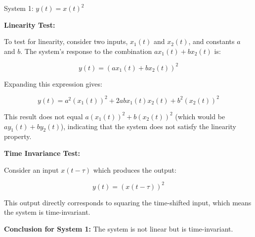 
\item[a)]
System 1: $y(t)=x(t)^{2}$

\textbf{Linearity Test:}

To test for linearity, consider two inputs, $x_1(t)$ and $x_2(t)$, and constants $a$ and $b$. The system's response to the combination $a x_1(t) + b x_2(t)$ is:

$$
y(t) = \left(a x_1(t) + b x_2(t)\right)^2
$$

Expanding this expression gives:

$$
y(t) = a^2 (x_1(t))^2 + 2ab x_1(t) x_2(t) + b^2 (x_2(t))^2
$$

This result does not equal $a (x_1(t))^2 + b (x_2(t))^2$ (which would be $a y_1(t) + b y_2(t)$), indicating that the system does not satisfy the linearity property.

\textbf{Time Invariance Test:}

Consider an input $x(t - \tau)$ which produces the output:

$$
y(t) = (x(t - \tau))^2
$$

This output directly corresponds to squaring the time-shifted input, which means the system is time-invariant.

\textbf{Conclusion for System 1:} The system is not linear but is time-invariant.